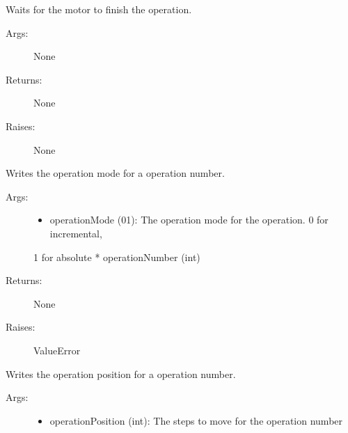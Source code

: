 \documentclass[letterpaper,10pt,english]{sphinxmanual}
\begin{document}
\begin{fulllineitems}
\begin{fulllineitems}
\end{fulllineitems}


\begin{fulllineitems}
\label{stepperMotor:stepperMotor.StepperMotor.waitFor}
Waits for the motor to finish the operation.
\begin{description}
\item[{Args:}] \leavevmode
None

\item[{Returns:}] \leavevmode
None

\item[{Raises:}] \leavevmode
None

\end{description}

\end{fulllineitems}


\begin{fulllineitems}
\label{stepperMotor:stepperMotor.StepperMotor.writeOperationMode}
Writes the operation mode for a operation number.
\begin{description}
\item[{Args:}] \leavevmode\begin{itemize}
\item {} 
operationMode (0\textbar{}1): The operation mode for the operation. 0 for incremental,

\end{itemize}

1 for absolute
* operationNumber (int)

\item[{Returns:}] \leavevmode
None

\item[{Raises:}] \leavevmode
ValueError

\end{description}

\end{fulllineitems}


\begin{fulllineitems}
\label{stepperMotor:stepperMotor.StepperMotor.writeOperationPosition}
Writes the operation position for a operation number.
\begin{description}
\item[{Args:}] \leavevmode\begin{itemize}
\item {} 
operationPosition (int): The steps to move for the operation number


\end{itemize}
\end{description}
\end{fulllineitems}
\end{fulllineitems}
\end{document}
